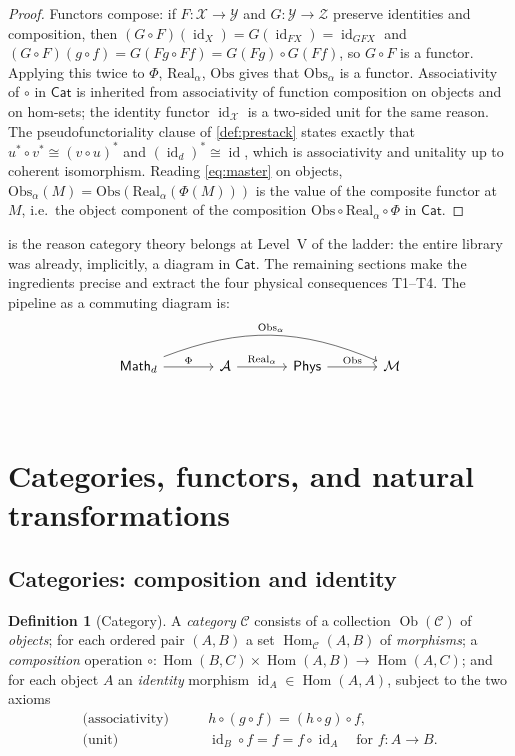\documentclass[12pt]{article}
\theoremstyle{definition}
\newtheorem{definition}[theorem]{Definition}
\theoremstyle{remark}
\newcommand{\Phys}{\mathsf{Phys}}
\newcommand{\Math}{\mathsf{Math}}
\newcommand{\Cat}{\mathsf{Cat}}
\newcommand{\Real}{\mathrm{Real}}
\newcommand{\Obs}{\mathrm{Obs}}
\newcommand{\Ob}{\operatorname{Ob}}
\newcommand{\Hom}{\operatorname{Hom}}
\newcommand{\id}{\operatorname{id}}
\begin{document}
\begin{proof}
Functors compose: if $F:\mathcal{X}\to\mathcal{Y}$ and $G:\mathcal{Y}\to\mathcal{Z}$
preserve identities and composition, then $(G\circ F)(\id_X)=G(\id_{FX})=\id_{GFX}$
and $(G\circ F)(g\circ f)=G(Fg\circ Ff)=G(Fg)\circ G(Ff)$, so $G\circ F$ is a
functor. Applying this twice to $\Phi$, $\Real_\alpha$, $\Obs$ gives that
$\Obs_\alpha$ is a functor. Associativity of $\circ$ in $\Cat$ is inherited from
associativity of function composition on objects and on hom-sets; the identity
functor $\id_{\mathcal{X}}$ is a two-sided unit for the same reason. The
pseudofunctoriality clause of \cref{def:prestack} states exactly that
$u^{*}\circ v^{*}\cong (v\circ u)^{*}$ and $(\id_d)^{*}\cong\id$, which is
associativity and unitality up to coherent isomorphism. Reading
\eqref{eq:master} on objects, $\Obs_\alpha(M)=\Obs(\Real_\alpha(\Phi(M)))$ is the
value of the composite functor at $M$, i.e.\ the object component of the
composition $\Obs\circ\Real_\alpha\circ\Phi$ in $\Cat$.
\end{proof}

 is the reason category theory belongs at Level~V of
the ladder: the entire library was already, implicitly, a diagram in $\Cat$. The
remaining sections make the ingredients precise and extract the four physical
consequences T1--T4. The pipeline as a commuting diagram is:
\begin{equation}
\label{eq:pipeline-cd}
\begin{tikzcd}[column sep=large, row sep=large]
\Math_d \arrow[r, "\Phi"] \arrow[rrr, bend left=22, "\Obs_\alpha"]
& \mathcal{A} \arrow[r, "\Real_\alpha"]
& \Phys \arrow[r, "\Obs"]
& \mathcal{M} \\
\end{tikzcd}
\end{equation}

\section{Categories, functors, and natural transformations}
\label{sec:cat}

\subsection{Categories: composition and identity}

\begin{definition}[Category]
\label{def:category}
A \emph{category} $\mathcal{C}$ consists of a collection $\Ob(\mathcal{C})$ of
\emph{objects}; for each ordered pair $(A,B)$ a set $\Hom_{\mathcal{C}}(A,B)$ of
\emph{morphisms}; a \emph{composition} operation
$\circ:\Hom(B,C)\times\Hom(A,B)\to\Hom(A,C)$; and for each object $A$ an
\emph{identity} morphism $\id_A\in\Hom(A,A)$, subject to the two axioms
\begin{align}
\text{(associativity)}\qquad & h\circ(g\circ f)=(h\circ g)\circ f, \label{eq:assoc}\\
\text{(unit)}\qquad & \id_B\circ f=f=f\circ\id_A \quad\text{for } f:A\to B.
\label{eq:unit}
\end{align}
\end{definition}
\end{document}
